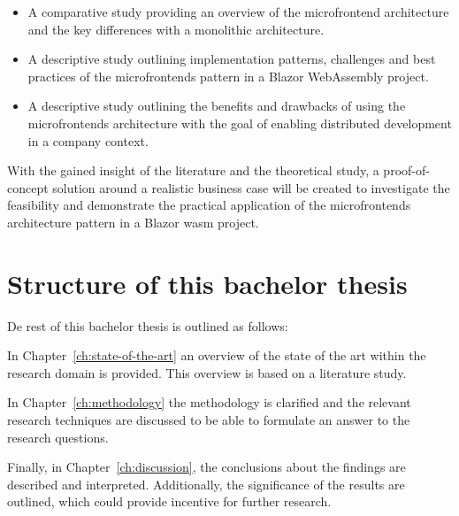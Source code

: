\begin{itemize}
  \item A comparative study providing an overview of the microfrontend
  architecture and the key differences with a monolithic architecture.
  \item A descriptive study outlining implementation patterns, challenges and
  best practices of the microfrontends pattern in a Blazor WebAssembly project.
  \item A descriptive study outlining the benefits and drawbacks of using the
  microfrontends architecture with the goal of enabling distributed
  development in a company context.
\end{itemize}

With the gained insight of the literature and the theoretical study, a
proof-of-concept solution around a realistic business case will be created to
investigate the feasibility and demonstrate the practical application of the
microfrontends architecture pattern in a Blazor \gls{wasm} project. 


\section{Structure of this bachelor thesis}
\label{sec:structure}


De rest of this bachelor thesis is outlined as follows:

In Chapter~\ref{ch:state-of-the-art} an overview of the state of the art within
the research domain is provided. This overview is based on a literature study.

In Chapter~\ref{ch:methodology} the methodology is clarified and the relevant
research techniques are discussed to be able to formulate an answer to the
research questions.


Finally, in Chapter~\ref{ch:discussion}, the conclusions about the findings are
described and interpreted. Additionally, the significance of the results are
outlined, which could provide incentive for further research.